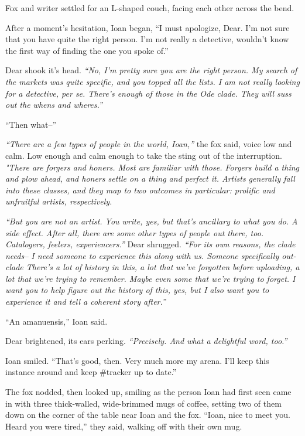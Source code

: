 Fox and writer settled for an L-shaped couch, facing each other across the bend.

After a moment's hesitation, Ioan began, ``I must apologize, Dear. I'm not sure that you have quite the right person. I'm not really a detective, wouldn't know the first way of finding the one you spoke of.''

Dear shook it's head. \emph{``No, I'm pretty sure you are the right person. My search of the markets was quite specific, and you topped all the lists. I am not really looking for a detective, per se. There's enough of those in the Ode clade. They will suss out the whens and wheres.''}

``Then what--''

\emph{``There are a few types of people in the world, Ioan,''} the fox said, voice low and calm. Low enough and calm enough to take the sting out of the interruption. \emph{"There are forgers and honers. Most are familiar with those. Forgers build a thing and plow ahead, and honers settle on a thing and perfect it. Artists generally fall into these classes, and they map to two outcomes in particular: prolific and unfruitful artists, respectively.}

\emph{``But you are not an artist. You write, yes, but that's ancillary to what you do. A side effect. After all, there are some other types of people out there, too. Catalogers, feelers, experiencers.''} Dear shrugged. \emph{``For its own reasons, the clade needs-- I need someone to experience this along with us. Someone specifically out-clade There's a lot of history in this, a lot that we've forgotten before uploading, a lot that we're trying to remember. Maybe even some that we're trying to forget. I want you to help figure out the history of this, yes, but I also want you to experience it and tell a coherent story after.''}

``An amanuensis,'' Ioan said.

Dear brightened, its ears perking. \emph{``Precisely. And what a delightful word, too.''}

Ioan smiled. ``That's good, then. Very much more my arena. I'll keep this instance around and keep \#tracker up to date.''

The fox nodded, then looked up, smiling as the person Ioan had first seen came in with three thick-walled, wide-brimmed mugs of coffee, setting two of them down on the corner of the table near Ioan and the fox. ``Ioan, nice to meet you. Heard you were tired,'' they said, walking off with their own mug.

